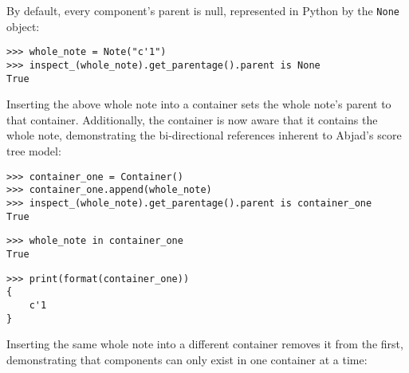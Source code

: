 \noindent By default, every component's parent is null, represented in Python
by the \texttt{None} object:

\begin{comment}
<abjad>
whole_note = Note("c'1")
inspect_(whole_note).get_parentage().parent is None
</abjad>
\end{comment}

\begin{abjadbookoutput}
\begin{singlespacing}
\vspace{-0.5\baselineskip}
\begin{verbatim}
>>> whole_note = Note("c'1")
>>> inspect_(whole_note).get_parentage().parent is None
True
\end{verbatim}
\end{singlespacing}
\end{abjadbookoutput}

\noindent Inserting the above whole note into a container sets the whole note's
parent to that container. Additionally, the container is now aware that it
contains the whole note, demonstrating the bi-directional references inherent
to Abjad's score tree model:

\begin{comment}
<abjad>
container_one = Container()
container_one.append(whole_note)
inspect_(whole_note).get_parentage().parent is container_one
whole_note in container_one
print(format(container_one))
</abjad>
\end{comment}

\begin{abjadbookoutput}
\begin{singlespacing}
\vspace{-0.5\baselineskip}
\begin{verbatim}
>>> container_one = Container()
>>> container_one.append(whole_note)
>>> inspect_(whole_note).get_parentage().parent is container_one
True
\end{verbatim}
\begin{verbatim}
>>> whole_note in container_one
True
\end{verbatim}
\begin{verbatim}
>>> print(format(container_one))
{
    c'1
}
\end{verbatim}
\end{singlespacing}
\end{abjadbookoutput}

\noindent Inserting the same whole note into a different container removes it
from the first, demonstrating that components can only exist in one container
at a time:

